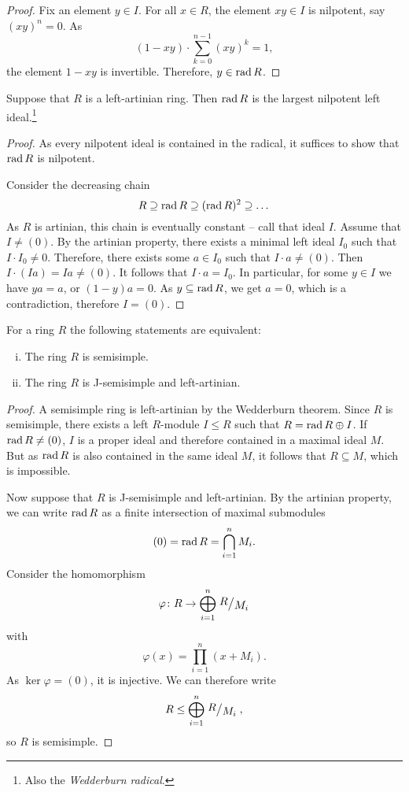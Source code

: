 \begin{proof}
Fix an element $y \in I$. For all $x \in R$, the element $xy \in I$
is nilpotent, say $(xy)^n = 0$. As
\[
(1 - xy) \cdot \sum_{k=0}^{n-1} (xy)^k = 1,
\]
the element $1 - xy$ is invertible. Therefore, $y \in \operatorname{rad} R$.
\end{proof}

\begin{izrek}
Suppose that $R$ is a left-artinian ring. Then $\operatorname{rad} R$ is the
largest nilpotent left
ideal.\footnote{Also the \emph{Wedderburn radical}.}
\end{izrek}

\begin{proof}
As every nilpotent ideal is contained in the radical, it suffices
to show that $\operatorname{rad} R$ is nilpotent.

Consider the decreasing chain
\[
R \supseteq \operatorname{rad} R \supseteq (\operatorname{rad} R)^2 \supseteq \dots
\]
As $R$ is artinian, this chain is eventually constant -- call that
ideal $I$. Assume that $I \ne (0)$. By the artinian property, there
exists a minimal left ideal $I_0$ such that $I \cdot I_0 \ne 0$.
Therefore, there exists some $a \in I_0$ such that
$I \cdot a \ne (0)$. Then $I \cdot (Ia) = Ia \ne (0)$. It follows
that $I \cdot a = I_0$. In particular, for some $y \in I$ we have
$ya = a$, or $(1-y) a = 0$. As $y \subseteq \operatorname{rad} R$, we get
$a = 0$, which is a contradiction, therefore $I = (0)$.
\end{proof}

\begin{izrek}
For a ring $R$ the following statements are equivalent:

\begin{enumerate}[i)]
\item The ring $R$ is semisimple.
\item The ring $R$ is J-semisimple and left-artinian.
\end{enumerate}
\end{izrek}

\begin{proof}
A semisimple ring is left-artinian by the Wedderburn theorem. Since
$R$ is semisimple, there exists a left $R$-module $I \leq R$ such
that $R = \operatorname{rad} R \oplus I$. If $\operatorname{rad} R \ne (0)$, $I$ is a proper
ideal and therefore contained in a maximal ideal $M$. But as
$\operatorname{rad} R$ is also contained in the same ideal $M$, it follows that
$R \subseteq M$, which is impossible.

Now suppose that $R$ is J-semisimple and left-artinian. By
the artinian property, we can write $\operatorname{rad} R$ as a finite
intersection of maximal submodules
\[
(0) = \operatorname{rad} R = \bigcap_{i=1}^n M_i.
\]
Consider the homomorphism
\[
\varphi \colon R \to \bigoplus_{i=1}^n \kvoc{R}{M_i}
\]
with
\[
\varphi(x) = \prod_{i=1}^n (x + M_i).
\]
As $\ker \varphi = (0)$, it is injective. We can therefore write
\[
R \leq \bigoplus_{i=1}^n \kvoc{R}{M_i},
\]
so $R$ is semisimple.
\end{proof}

